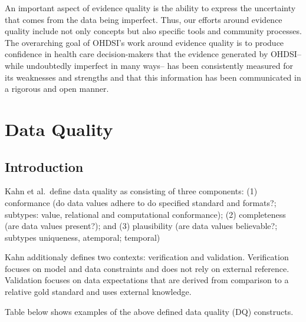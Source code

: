 \documentclass[11pt]{book}
\theoremstyle{definition}
\theoremstyle{definition}
\theoremstyle{definition}
\theoremstyle{remark}
\begin{document}
An important aspect of evidence quality is the ability to express the uncertainty that comes from the data being imperfect. Thus, our efforts around evidence quality include not only concepts but also specific tools and community processes. The overarching goal of OHDSI's work around evidence quality is to produce confidence in health care decision-makers that the evidence generated by OHDSI-- while undoubtedly imperfect in many ways-- has been consistently measured for its weaknesses and strengths and that this information has been communicated in a rigorous and open manner.

\hypertarget{DataQuality}{%
\chapter{Data Quality}\label{DataQuality}}

\hypertarget{introduction-1}{%
\section{Introduction}\label{introduction-1}}

Kahn et al.~define data quality as consisting of three components: (1) conformance (do data values adhere to do specified standard and formats?; subtypes: value, relational and computational conformance); (2) completeness (are data values present?); and (3) plausibility (are data values believable?; subtypes uniqueness, atemporal; temporal) \citep{kahn_harmonized_2016}

Kahn additionaly defines two contexts: verification and validation. Verification focuses on model and data constraints and does not rely on external reference. Validation focuses on data expectations that are derived from comparison to a relative gold standard and uses external knowledge.

Table below shows examples of the above defined data quality (DQ) constructs.
\end{document}
